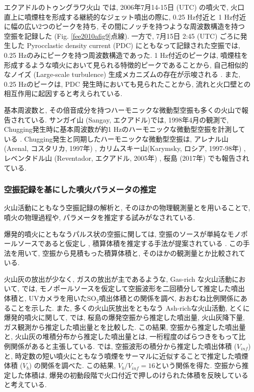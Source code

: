 \documentclass[12pt]{article}
\begin{document}
エクアドルのトゥングラワ火山 \citep{Fee2010} では, 2006年7月14-15日 (UTC) の噴火で, 火口直上に噴煙柱を形成する継続的なジェット噴出の際に, 0.25 Hz付近と 1 Hz付近に幅の広い2つのピークを持ち, その間にノッチを持つような周波数構造を持つ空振を記録した (Fig. \ref{fee2010afig9}点線). 一方で, 7月15日 2:45 (UTC) ごろに発生した Pyrocclastic density current (PDC) にともなって記録された空振では, 0.25 Hzのみにピークを持つ周波数構造であった. 1 Hz付近のピークは, 噴煙柱を形成するような噴火において見られる特徴的ピークであることから, 自己相似的なノイズ (Large-scale turbulence) 生成メカニズムの存在が示唆される \citep{Matoza2009a}. また, 0.25 Hzのピークは, PDC 発生時においても見られたことから, 流れと火口壁との相互作用に起因すると考えられている.


基本周波数と, その倍音成分を持つハーモニックな微動型空振も多くの火山で報告されている. サンガイ山 (Sangay, エクアドル)では, 1998年4月の観測で, Chugging発生時に基本周波数が約1 Hzのハーモニックな微動型空振を計測している \citep{Johnson2000}. Chugging発生と同期したハーモニックな微動型空振は, アレナル山 (Arenal, コスタリカ, 1997年) \citep{Hagerty2000}, カリムスキー山(Karymsky, ロシア, 1997-98年) \citep{Johnson2000}, レベンタドル山 (Reventador, エクアドル, 2005年) \citep{Lees2008}, 桜島 (2017年) \citep{sakai1996, iguchi2018} でも報告されている.


\clearpage
\subsubsection{空振記録を基にした噴火パラメータの推定}\label{AcointPara}

火山活動にともなう空振記録の解析と, そのほかの物理観測量とを用いることで, 噴火の物理過程や, パラメータを推定する試みがなされている. 

爆発的噴火にともなうパルス状の空振に関しては, 空振のソースが単純なモノポールソースであると仮定し \citep{Lighthill1978}, 積算体積を推定する手法が提案されている \citep{Johnson2003}. この手法を用いて, 空振から見積もった積算体積と, そのほかの観測量とか比較されている.

火山灰の放出が少なく, ガスの放出が主であるような, Gas-rich な火山活動において, \cite{Dalton2010}では, モノポールソースを仮定して空振波形を二回積分して推定した噴出体積と, UVカメラを用いたSO$_2$噴出体積との関係を調べ, おおむね比例関係にあることを示した.
また, 多くの火山灰放出をともなう Ash-richな火山活動, とくに爆発的噴火に関して, \cite{Fee2017a}では, 桜島の爆発空振から推定した噴出量, 火山灰降下量, ガス観測から推定した噴出量とを比較した. この結果, 空振から推定した噴出量と, 火山灰の堆積分布から推定した噴出量とは, 一桁程度のばらつきをもって比例関係があると主張している.
\cite{Yamada2018b}では, 空振波形の積分から推定した噴出体積 ($V_{inf}$)と, 時定数の短い噴火にともなう噴煙をサーマルに近似することで推定した噴煙体積 ($V_{b}$) の関係を調べた. この結果, $V_{b}/V_{inf}=16$という関係を得た. 空振から推定した体積は, 爆発の初動段階で火口付近で押しのけられた体積を反映していると考えている. 
\end{document}
